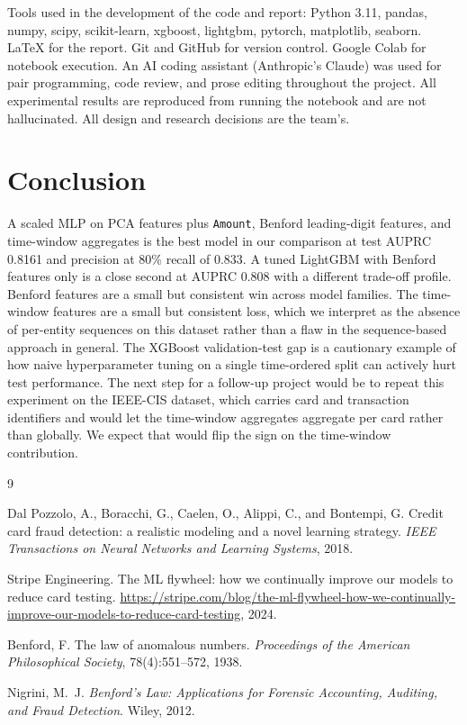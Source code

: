 \documentclass{article}
\begin{document}
Tools used in the development of the code and report: Python 3.11, pandas, numpy, scipy, scikit-learn, xgboost, lightgbm, pytorch, matplotlib, seaborn. LaTeX for the report. Git and GitHub for version control. Google Colab for notebook execution. An AI coding assistant (Anthropic's Claude) was used for pair programming, code review, and prose editing throughout the project. All experimental results are reproduced from running the notebook and are not hallucinated. All design and research decisions are the team's.

\section{Conclusion}

A scaled MLP on PCA features plus \texttt{Amount}, Benford leading-digit features, and time-window aggregates is the best model in our comparison at test AUPRC 0.8161 and precision at 80\% recall of 0.833. A tuned LightGBM with Benford features only is a close second at AUPRC 0.808 with a different trade-off profile. Benford features are a small but consistent win across model families. The time-window features are a small but consistent loss, which we interpret as the absence of per-entity sequences on this dataset rather than a flaw in the sequence-based approach in general. The XGBoost validation-test gap is a cautionary example of how naive hyperparameter tuning on a single time-ordered split can actively hurt test performance. The next step for a follow-up project would be to repeat this experiment on the IEEE-CIS dataset, which carries card and transaction identifiers and would let the time-window aggregates aggregate per card rather than globally. We expect that would flip the sign on the time-window contribution.


\begin{thebibliography}{9}

Dal Pozzolo, A., Boracchi, G., Caelen, O., Alippi, C., and Bontempi, G.
Credit card fraud detection: a realistic modeling and a novel learning strategy.
\textit{IEEE Transactions on Neural Networks and Learning Systems}, 2018.

Stripe Engineering.
The ML flywheel: how we continually improve our models to reduce card testing.
\url{https://stripe.com/blog/the-ml-flywheel-how-we-continually-improve-our-models-to-reduce-card-testing}, 2024.

Benford, F.
The law of anomalous numbers.
\textit{Proceedings of the American Philosophical Society}, 78(4):551--572, 1938.

Nigrini, M.~J.
\textit{Benford's Law: Applications for Forensic Accounting, Auditing, and Fraud Detection}.
Wiley, 2012.

\end{thebibliography}
\end{document}
